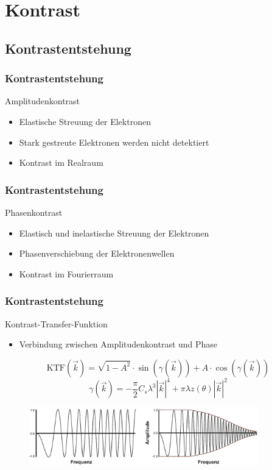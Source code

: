 \section[Kontrast]{Kontrast} %
\label{sec:kontrastierung}


\subsection{Kontrastentstehung} %
\label{sub:kontrastentstehung}

\begin{frame}
	\frametitle{Kontrastentstehung}
	\begin{block}{Amplitudenkontrast}
		\begin{itemize}
			\item Elastische Streuung der Elektronen
			\item Stark gestreute Elektronen werden nicht detektiert
			\item Kontrast im Realraum
		\end{itemize}		
	\end{block}
\end{frame}

\begin{frame}
	\frametitle{Kontrastentstehung}
	\begin{block}{Phasenkontrast}
		\begin{itemize}
			\item Elastisch und inelastische Streuung der Elektronen
			\item Phasenverschiebung der Elektronenwellen
			\item Kontrast im Fourierraum
		\end{itemize}
	\end{block}
\end{frame}

\begin{frame}
	\frametitle{Kontrastentstehung}
	\begin{block}{Kontrast-Transfer-Funktion}
		\begin{itemize}
			\item Verbindung zwischen Amplitudenkontrast und Phase
		\end{itemize}
	\end{block}
	\begin{equation*}
		\text{KTF}(\vec{k})=\sqrt{1-A^2}\cdot \sin{(\gamma(\vec{k}))} + A \cdot \cos{(\gamma(\vec{k}))}
	\end{equation*}
	\begin{equation*}
		\gamma(\vec{k}) = -\frac{\pi}{2}C_s \lambda^3 |\vec{k}|^4 + \pi \lambda z(\theta) |\vec{k}|^2
	\end{equation*}
	\begin{figure}
		\includegraphics[width = 10cm]{pic/KTF.png}
	\end{figure}
\end{frame}

